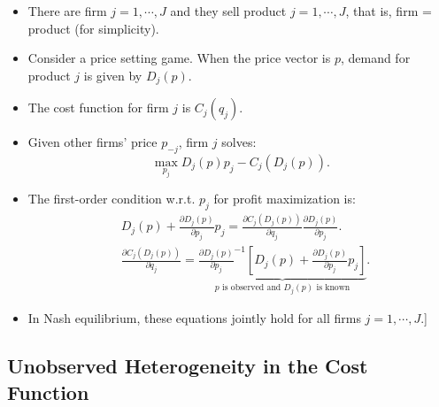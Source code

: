\documentclass[
]{book}
\begin{document}
\begin{itemize}
\item
  There are firm \(j = 1, \cdots, J\) and they sell product \(j = 1, \cdots, J\), that is, firm = product (for simplicity).
\item
  Consider a price setting game. When the price vector is \(p\), demand for product \(j\) is given by \(D_j(p)\).
\item
  The cost function for firm \(j\) is \(C_j(q_j)\).
\item
  Given other firms' price \(p_{-j}\), firm \(j\) solves:
  \begin{equation}
  \max_{p_j} D_j(p) p_j - C_j(D_j(p)).
  \end{equation}
\item
  The first-order condition w.r.t. \(p_j\) for profit maximization is:
  \begin{equation}
  \begin{split}
  &D_j(p) + \frac{\partial D_j(p)}{\partial p_j} p_j = \frac{\partial C_j(D_j(p))}{\partial q_j} \frac{\partial D_j(p)}{\partial p_j}.\\
  &\frac{\partial C_j(D_j(p))}{\partial q_j} = \underbrace{\frac{\partial D_j(p)}{\partial p_j}^{-1}[D_j(p) + \frac{\partial D_j(p)}{\partial p_j} p_j ]}_{\text{$p$ is observed and $D_j(p)$ is known}}.
  \end{split}
  \end{equation}
\item
  In Nash equilibrium, these equations jointly hold for all firms \(j = 1, \cdots, J\).{]}
\end{itemize}

\hypertarget{unobserved-heterogeneity-in-the-cost-function}{%
\subsection{Unobserved Heterogeneity in the Cost Function}\label{unobserved-heterogeneity-in-the-cost-function}}
\end{document}
